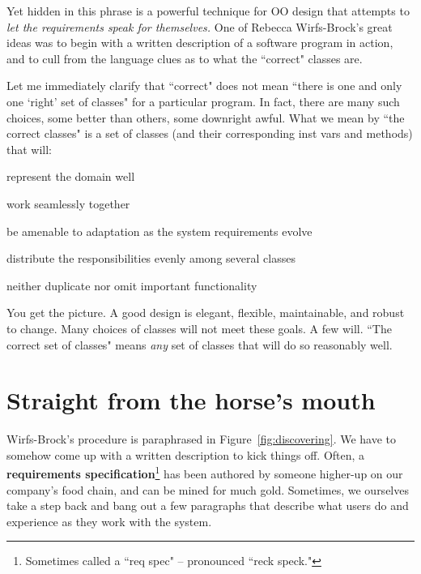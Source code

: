 Yet hidden in this phrase is a powerful technique for OO design that attempts
to \textit{let the requirements speak for themselves.} One of Rebecca
Wirfs-Brock's great ideas was to begin with a written description of a
software program in action, and to cull from the language clues as to what the
``correct" classes are.

Let me immediately clarify that ``correct" does not mean ``there is one and
only one `right' set of classes" for a particular program. In fact, there are
many such choices, some better than others, some downright awful. What we
mean by ``the correct classes" is a set of classes (and their corresponding
inst vars and methods) that will:

\begin{compactitem}
\item represent the domain well
\item work seamlessly together
\item be amenable to adaptation as the system requirements evolve
\item distribute the responsibilities evenly among several classes
\item neither duplicate nor omit important functionality
\end{compactitem}

You get the picture. A good design is elegant, flexible, maintainable, and
robust to change. Many choices of classes will not meet these goals. A few
will. ``The correct set of classes" means \textit{any} set of classes that
will do so reasonably well.

\section{Straight from the horse's mouth}
\label{reqSpec}

Wirfs-Brock's procedure is paraphrased in Figure~\ref{fig:discovering}. We
have to somehow come up with a written description to kick things off. Often,
a \textbf{requirements specification}\footnote{Sometimes called a ``req spec"
-- pronounced ``reck speck."} has been authored by someone higher-up on our
company's food chain, and can be mined for much gold. Sometimes, we ourselves
take a step back and bang out a few paragraphs that describe what users do and
experience as they work with the system.

